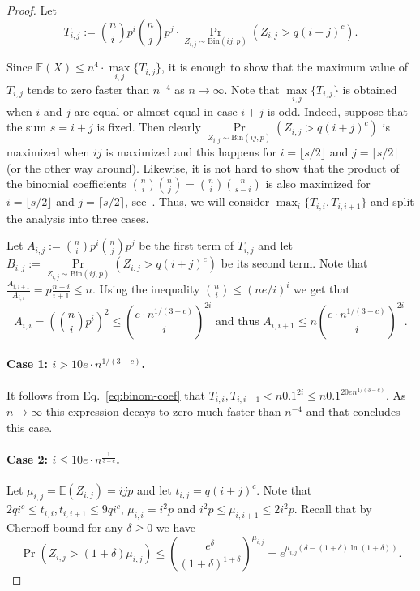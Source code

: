 \documentclass[11pt]{article}
\theoremstyle{definition}
\newcommand{\E}[1]{\mathbb{E}(#1)}
\begin{document}
\begin{proof}
	Let
	$$ T_{i,j} := \binom{n}{i} p^i \binom{n}{j} p^j \cdot \underset{Z_{i,j} \sim \textrm{Bin}(ij,p)}{\Pr}(Z_{i,j} > q(i+j)^{c}) .$$
	
	Since $\E{X} \le n^4 \cdot \underset{i,j}{\max} \{T_{i,j}\}$, it is enough to show that the maximum value of $T_{i,j}$ tends to zero faster than $n^{-4}$ as $n \rightarrow \infty$.
	Note that $ \underset{i,j}{\max} \{T_{i,j}\}$ is obtained when $i$ and $j$ are equal or almost equal in case $i+j$ is odd.
	Indeed, suppose that the sum $s=i+j$ is fixed.
	Then clearly $\underset{Z_{i,j} \sim \textrm{Bin}(ij,p)}{\Pr}(Z_{i,j} > q(i+j)^{c})$ is maximized when $ij$ is maximized and this happens for $i=\lfloor s/2 \rfloor$ and $j=\lceil s/2 \rceil$ (or the other way around).
	Likewise, it is not hard to show that the product of the binomial coefficients  $\binom{n}{i}\binom{n}{j}=\binom{n}{i}\binom{n}{s-i}$ is also maximized for $i=\lfloor s/2 \rfloor$ and $j=\lceil s/2 \rceil$, see~\cite{stack}. 
	Thus, we will consider $\max_i \{T_{i,i}, T_{i,i+1}\}$ 
	and split the analysis into three cases.
	
	Let $A_{i,j} := \binom{n}{i}p^i \binom{n}{j}p^j$ be the first term of $T_{i,j}$ and let $B_{i,j} := \underset{Z_{i,j} \sim \textrm{Bin}(ij,p)}{\Pr}(Z_{i,j} > q(i+j)^{c})$ be its second term.
	Note that $\frac{A_{i,i+1}}{A_{i,i}} = p\frac{n-i}{i+1} \le n$.	
	Using the inequality $\binom{n}{i} \le (ne/i)^i$ we get that
	\begin{equation}\label{eq:binom-coef}
		A_{i,i} = \left(\binom{n}{i} p^{i}\right)^2 \le \left(\frac{e\cdot n^{1/(3-c)}}{i}\right)^{2i} \textrm{ and thus } A_{i,i+1} \le n\left(\frac{e\cdot n^{1/(3-c)}}{i}\right)^{2i}.
	\end{equation}
	
	\paragraph{Case 1: $i > 10e\cdot n^{1/(3-c)}$.}
	It follows from Eq.~\eqref{eq:binom-coef} that $T_{i,i}, T_{i,i+1} < n 0.1^{2i} \le n 0.1^{20en^{1/(3-c)}}$. As $n \rightarrow \infty$ this expression decays to zero much faster than $n^{-4}$ and that concludes this case.
	
	\paragraph{Case 2: $i \le 10e\cdot n^{\frac{1}{3-c}}$.}
	Let $\mu_{i,j} = \E{Z_{i,j}} = ijp$ and let $t_{i,j} = q(i+j)^c$.
	Note that $2qi^c \le t_{i,i}, t_{i,i+1} \le 9qi^c$, $\mu_{i,i}=i^2 p$ and $i^2 p \le \mu_{i,i+1} \le 2i^2 p$. 
	Recall that by Chernoff bound for any $\delta \ge 0$ we have 
	$$\Pr(Z_{i,j}>(1+\delta)\mu_{i,j}) \le \left(\frac{e^{\delta}}{(1+\delta)^{1+\delta}}\right)^{\mu_{i,j}} = 
	e^{\mu_{i,j}(\delta-(1+\delta)\ln(1+\delta))}.$$
	

\end{proof}
\end{document}
